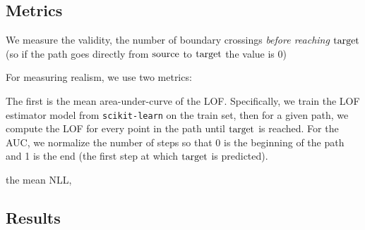 \documentclass[../main.tex]{subfiles}
\begin{document}





\subsection{Metrics}

We measure the validity, the number of boundary crossings \emph{before reaching $\mathrm{target}$} (so if the path goes directly from $\mathrm{source}$ to $\mathrm{target}$ the value is 0)

For measuring realism, we use two metrics:


The first is the mean area-under-curve of the LOF.
Specifically, we train the LOF estimator model from \texttt{scikit-learn} on the train set, then for a given path, we compute the LOF for every point in the path until $\mathrm{target}$ is reached.
For the AUC, we normalize the number of steps so that 0 is the beginning of the path and 1 is the end (the first step at which $\mathrm{target}$ is predicted).



the mean NLL,

\subsection{Results}
\end{document}
